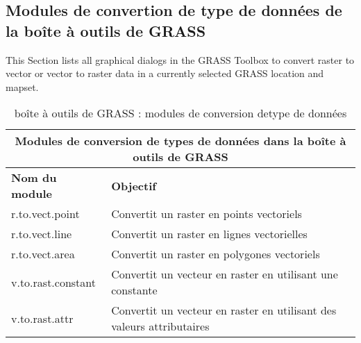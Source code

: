 \subsection{Modules de convertion de type de donn\'ees de la bo\^ite \`a outils de GRASS}

This Section lists all graphical dialogs in the GRASS Toolbox to convert raster to vector or vector to raster data in a currently selected GRASS location and mapset.

\begin{table}[ht]
\centering
\caption{bo\^ite \`a outils de GRASS : modules de conversion detype de donn\'ees}\medskip
 \begin{tabular}{|p{4cm}|p{12cm}|}
  \hline \multicolumn{2}{|c|}{\textbf{Modules de conversion de types de donn\'ees dans la bo\^ite \`a outils de GRASS}} \\
  \hline \textbf{Nom du module} & \textbf{Objectif} \\
  \hline r.to.vect.point & Convertit un raster en points vectoriels \\
  \hline r.to.vect.line & Convertit un raster en lignes vectorielles \\
  \hline r.to.vect.area & Convertit un raster en polygones vectoriels \\
  \hline v.to.rast.constant & Convertit un vecteur en raster en utilisant une constante \\
  \hline v.to.rast.attr & Convertit un vecteur en raster en utilisant des valeurs attributaires\\
\hline
\end{tabular}
\end{table}

